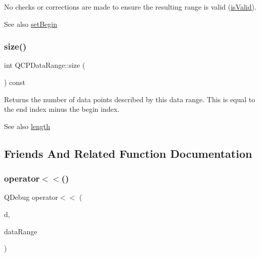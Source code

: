 No checks or corrections are made to ensure the resulting range is valid (\hyperlink{class_q_c_p_data_range_aae53a37472212dca0a7939963e20dba0}{is\+Valid}).

\begin{DoxySeeAlso}{See also}
\hyperlink{class_q_c_p_data_range_a54ff59048e01e46ac4aefafc844626c6}{set\+Begin} 
\end{DoxySeeAlso}
\mbox{\label{class_q_c_p_data_range_ac6af055e509d1b691c244954ff1c5887}} 
\subsubsection{\texorpdfstring{size()}{size()}}
{\footnotesize\ttfamily int Q\+C\+P\+Data\+Range\+::size (\begin{DoxyParamCaption}{ }\end{DoxyParamCaption}) const\hspace{0.3cm}{\ttfamily [inline]}}

Returns the number of data points described by this data range. This is equal to the end index minus the begin index.

\begin{DoxySeeAlso}{See also}
\hyperlink{class_q_c_p_data_range_a1e7836058f755c6ab9f11996477b7150}{length} 
\end{DoxySeeAlso}


\subsection{Friends And Related Function Documentation}
\mbox{\label{class_q_c_p_data_range_a486dd7af8a090ed069672e3510e6a082}} 
\subsubsection{\texorpdfstring{operator$<$$<$()}{operator<<()}}
{\footnotesize\ttfamily Q\+Debug operator$<$$<$ (\begin{DoxyParamCaption}\item[{Q\+Debug}]{d,  }\item[{const \hyperlink{class_q_c_p_data_range}{Q\+C\+P\+Data\+Range} \&}]{data\+Range }\end{DoxyParamCaption})\hspace{0.3cm}{\ttfamily [related]}}

